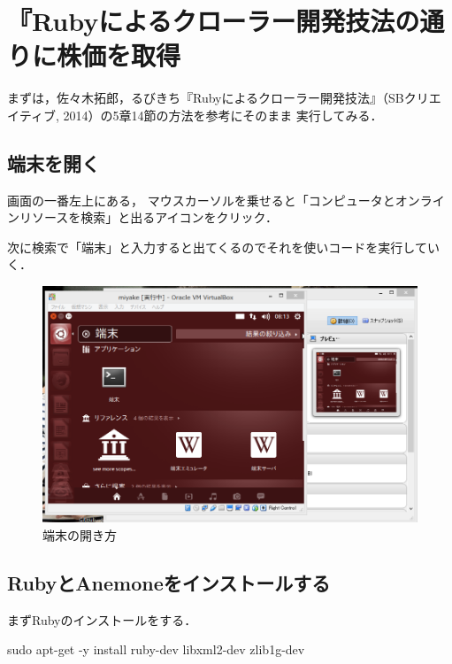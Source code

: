 \section{『Rubyによるクローラー開発技法の通りに株価を取得}


まずは，佐々木拓郎，るびきち『Rubyによるクローラー開発技法』（SBクリエイティブ, 2014）の5章14節の方法を参考にそのまま
実行してみる．

\subsection{端末を開く}

画面の一番左上にある，
マウスカーソルを乗せると「コンピュータとオンラインリソースを検索」と出るアイコンをクリック．

次に検索で「端末」と入力すると出てくるのでそれを使いコードを実行していく．
\begin{figure}[H]
\centering
\includegraphics[width=15cm]{tanmatu.PNG}
\caption{端末の開き方}\label{サンプル図}
\end{figure}


\subsection{RubyとAnemoneをインストールする}

まずRubyのインストールをする．

sudo apt-get -y install ruby-dev libxml2-dev zlib1g-dev

